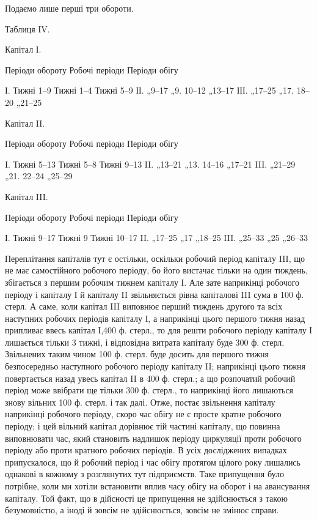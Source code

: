 Подаємо лише перші три обороти.

Таблиця IV.

Капітал І.

Періоди обороту Робочі періоди    Періоди обігу

І. Тижні 1--9 Тижні 1--4    Тижні 5--9
ІІ. „9--17 „9. 10--12 „13--17
ІІІ. „17--25 „17. 18--20 „21--25

Капітал II.

Періоди обороту Робочі періоди    Періоди обігу

I. Тижні 5--13  Тижні 5--8  Тижні 9--13
II. „13--21 „13. 14--16 „17--21
III. „21--29 „21. 22--24 „25--29

Капітал III.

Періоди обороту Робочі періоди    Періоди обігу

І. Тижні 9--17   Тижні 9 Тижні 10--17
II. „17--25 „17 „18--25
III. „25--33 „25 „26--33

Переплітання капіталів тут є остільки, оскільки робочий період капіталу
III, що не має самостійного робочого періоду, бо його вистачає
тільки на один тиждень, збігається з першим робочим тижнем капіталу І.
Але зате наприкінці робочого періоду і капіталу І й капіталу II
звільняється рівна капіталові III сума в 100 ф. стерл. А саме, коли капітал
III виповнює перший тиждень другого та всіх наступних робочих періодів
капіталу І, а наприкінці цього першого тижня назад припливає ввесь
капітал І,400 ф. стерл., то для решти робочого періоду капіталу І лишається
тільки 3 тижні, і відповідна витрата капіталу буде 300 ф. стерл. Звільнених
таким чином 100 ф. стерл. буде досить для першого тижня безпосередньо
наступного робочого періоду капіталу II; наприкінці цього тижня повертається
назад увесь капітал II в 400 ф. стерл.; а що розпочатий робочий
період може ввібрати ще тільки 300 ф. стерл., то наприкінці його лишаються
знову вільних 100 ф. стерл. і так далі. Отже, постає звільнення капіталу
наприкінці робочого періоду, скоро час обігу не є просте кратне
робочого періоду; і цей вільний капітал дорівнює тій частині капіталу,
що повинна виповнювати час, який становить надлишок періоду циркуляції
проти робочого періоду або проти кратного робочих періодів.
В усіх досліджених випадках припускалося, що й робочий період і
час обігу протягом цілого року лишались однакові в кожному з розглянутих
тут підприємств. Таке припущення було потрібне, коли ми хотіли
встановити вплив часу обігу на оборот і на авансування капіталу. Той
факт, що в дійсності це припущення не здійснюється з такою безумовністю,
а іноді й зовсім не здійснюється, зовсім не змінює справи.

